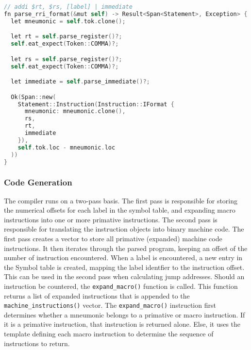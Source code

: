\begin{lstlisting}[language=C]
// addi $rt, $rs, [label] | immediate
fn parse_rri_format(&mut self) -> Result<Span<Statement>, Exception> {
  let mneumonic = self.tok.clone();

  let rt = self.parse_register()?;
  self.eat_expect(Token::COMMA)?;

  let rs = self.parse_register()?;
  self.eat_expect(Token::COMMA)?;

  let immediate = self.parse_immediate()?;

  Ok(Span::new(
    Statement::Instruction(Instruction::IFormat { 
      mneumonic: mneumonic.clone(), 
      rs, 
      rt, 
      immediate 
    }),
    self.tok.loc - mneumonic.loc
  ))
}
\end{lstlisting}

\subsubsection{Code Generation}
The compiler runs on a two-pass basis. The first pass is responsible for storing the numerical offsets for each label in the symbol table, and expanding macro instructions into one or more primative instructions. The second pass is responsible for translating the instruction objects into binary machine code. The first pass creates a vector to store all primative (expanded) machine code instructions. It then iterates through the parsed program, keeping an offset of the number of instruction encountered. When a label is encountered, a new entry in the Symbol table is created, mapping the label identfier to the instruction offset. This can be used in the second pass when calculating jump addresses. Should an instruction be countered, the \texttt{expand\_macro()} function is called. This function returns a list of expanded instructions that is appended to the \texttt{machine\_instructions()} vector. The \texttt{expand\_macro()} instruction first determines whether a mneumonic belongs to a primative or macro instruction. If it is a primative instruction, that instruction is returned alone. Else, it uses the template defining each macro instruction to determine the sequence of instructions to return.

